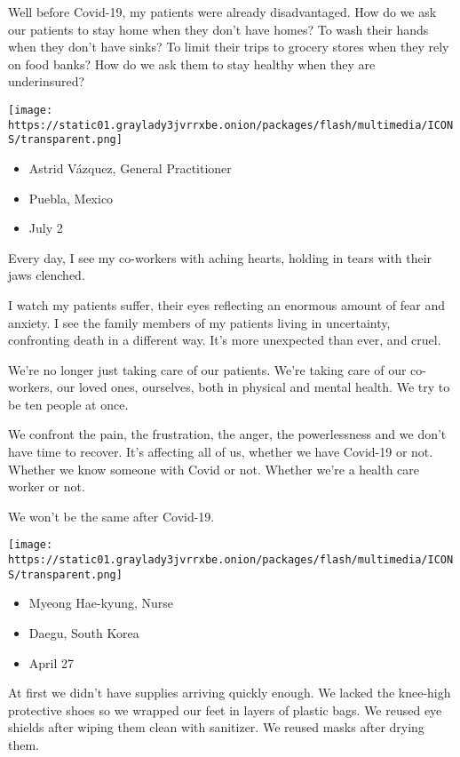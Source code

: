 Well before Covid-19, my patients were already disadvantaged. How do we
ask our patients to stay home when they don't have homes? To wash their
hands when they don't have sinks? To limit their trips to grocery stores
when they rely on food banks? How do we ask them to stay healthy when
they are underinsured?

\texttt{[image: https://static01.graylady3jvrrxbe.onion/packages/flash/multimedia/ICONS/transparent.png]}

\begin{itemize}
\tightlist
\item
  Astrid Vázquez, General Practitioner
\item
  Puebla, Mexico
\item
  July 2
\end{itemize}

Every day, I see my co-workers with aching hearts, holding in tears with
their jaws clenched.

I watch my patients suffer, their eyes reflecting an enormous amount of
fear and anxiety. I see the family members of my patients living in
uncertainty, confronting death in a different way. It's more unexpected
than ever, and cruel.

We're no longer just taking care of our patients. We're taking care of
our co-workers, our loved ones, ourselves, both in physical and mental
health. We try to be ten people at once.

We confront the pain, the frustration, the anger, the powerlessness and
we don't have time to recover. It's affecting all of us, whether we have
Covid-19 or not. Whether we know someone with Covid or not. Whether
we're a health care worker or not.

We won't be the same after Covid-19.

\texttt{[image: https://static01.graylady3jvrrxbe.onion/packages/flash/multimedia/ICONS/transparent.png]}

\begin{itemize}
\tightlist
\item
  Myeong Hae-kyung, Nurse
\item
  Daegu, South Korea
\item
  April 27
\end{itemize}

At first we didn't have supplies arriving quickly enough. We lacked the
knee-high protective shoes so we wrapped our feet in layers of plastic
bags. We reused eye shields after wiping them clean with sanitizer. We
reused masks after drying them.

